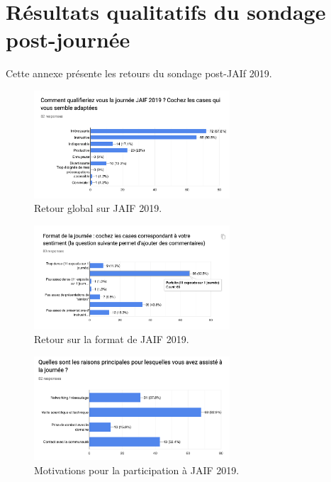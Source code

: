 \documentclass[a4paper,11pt]{article}
\begin{document}
\appendix

\section{Résultats qualitatifs du sondage post-journée}
\label{sec:org5aa3453}

\label{annexe:sondage}
Cette annexe présente les retours du sondage post-JAIf 2019.

\begin{figure}[h]
\centering
\includegraphics[width=0.65\textwidth]{images/retour_qualificatif_jaif2019.png}
\caption{Retour global sur JAIF 2019.}
\end{figure}

\begin{figure}[h]
\centering
\includegraphics[width=0.65\textwidth]{images/retour_format_jaif2019.png}
\caption{Retour sur la format de JAIF 2019.}
\end{figure}

\begin{figure}[h]
\centering
\includegraphics[width=0.65\textwidth]{images/motivations_jaif2019.png}
\caption{Motivations pour la participation à JAIF 2019.}
\end{figure}
\end{document}
